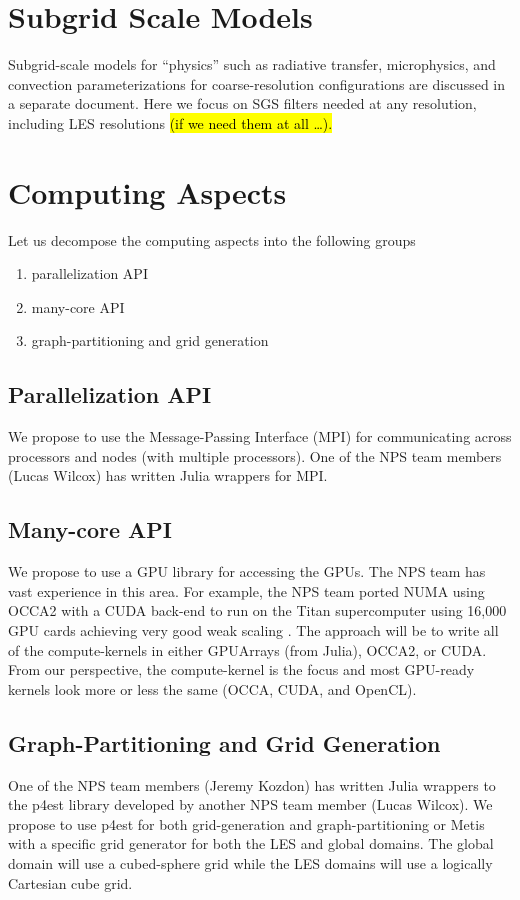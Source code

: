 \documentclass{article}
\begin{document}
\section{Subgrid Scale Models}
\label{sec:sgs_models}

Subgrid-scale models for ``physics'' such as radiative transfer, microphysics, and convection parameterizations for coarse-resolution configurations are discussed in a separate document. Here we focus on SGS filters needed at any resolution, including LES resolutions \hl{(if we need them at all \dots).}


\section{Computing Aspects}
\label{sec:computing_aspects}

Let us decompose the computing aspects into the following groups
\begin{enumerate}
\item parallelization API
\item many-core API
\item graph-partitioning and grid generation

\end{enumerate}

\subsection{Parallelization API}
We propose to use the Message-Passing Interface (MPI) for communicating across processors and nodes (with multiple processors).  One of the NPS team members (Lucas Wilcox) has written Julia wrappers for MPI.

\subsection{Many-core API}
\label{sec:computing_aspects/manycore}
We propose to use a GPU library for accessing the GPUs. The NPS team has vast experience in this area. For example, the NPS team ported NUMA using OCCA2 with a CUDA back-end to run on the Titan supercomputer using 16,000 GPU cards achieving very good weak scaling \citep{abdi:2016b,abdi:2018}. The approach will be to write all of the compute-kernels in either GPUArrays (from Julia), OCCA2, or CUDA. From our perspective, the compute-kernel is the focus and most GPU-ready kernels look more or less the same (OCCA, CUDA, and OpenCL). 

\subsection{Graph-Partitioning and Grid Generation}
One of the NPS team members (Jeremy Kozdon) has written Julia wrappers to the p4est library developed by another NPS team member (Lucas Wilcox).  We propose to use p4est for both grid-generation and graph-partitioning or Metis with a specific grid generator for both the LES and global domains. The global domain will use a cubed-sphere grid while the LES domains will use a logically Cartesian cube grid.
\end{document}

